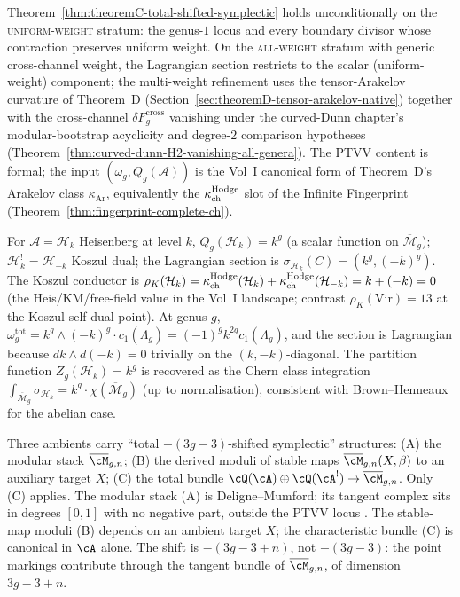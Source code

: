 \begin{remark}
\label{rem:theoremC-total-scope}
Theorem~\ref{thm:theoremC-total-shifted-symplectic} holds
unconditionally on the \textsc{uniform-weight} stratum: the
genus-$1$ locus and every boundary divisor whose contraction
preserves uniform weight. On the \textsc{all-weight} stratum
with generic cross-channel weight, the Lagrangian section
restricts to the scalar (uniform-weight) component; the
multi-weight refinement uses the tensor-Arakelov curvature of
Theorem~D (Section~\ref{sec:theoremD-tensor-arakelov-native})
together with the cross-channel
$\delta F_g^{\mathrm{cross}}$ vanishing under the curved-Dunn
chapter's modular-bootstrap acyclicity and degree-\(2\)
comparison hypotheses
(Theorem~\ref{thm:curved-dunn-H2-vanishing-all-genera}). The
PTVV content is formal; the input
$(\omega_g, Q_g(\mathcal{A}))$ is the Vol~I canonical form of
Theorem~D's Arakelov class $\kappa_{\mathrm{Ar}}$, equivalently
the $\kappa_{\mathrm{ch}}^{\mathrm{Hodge}}$ slot of the Infinite Fingerprint
(Theorem~\ref{thm:fingerprint-complete-ch}).
\end{remark}

\begin{example}
\label{ex:theoremC-heisenberg}
For $\mathcal{A} = \mathcal{H}_k$ Heisenberg at level $k$,
$Q_g(\mathcal{H}_k) = k^g$ (a scalar function on
$\overline{\mathcal{M}}_g$); $\mathcal{H}_k^! = \mathcal{H}_{-k}$
Koszul dual; the Lagrangian section is
$\sigma_{\mathcal{H}_k}(C) = (k^g, (-k)^g)$. The Koszul conductor
is $\rho_K(\mathcal{H}_k) = \kappa_{\mathrm{ch}}^{\mathrm{Hodge}}(\mathcal{H}_k) +
\kappa_{\mathrm{ch}}^{\mathrm{Hodge}}(\mathcal{H}_{-k}) = k + (-k) = 0$ (the Heis/KM/free-field
value in the Vol~I landscape; contrast $\rho_K(\mathrm{Vir}) = 13$
at the Koszul self-dual point).
At genus $g$, $\omega^{\mathrm{tot}}_g = k^g \wedge (-k)^g \cdot
c_1(\Lambda_g) = (-1)^g k^{2g} c_1(\Lambda_g)$, and the section is
Lagrangian because $dk \wedge d(-k) = 0$ trivially on the
$(k,-k)$-diagonal. The partition function
$Z_g(\mathcal{H}_k) = k^g$ is recovered as the Chern class
integration $\int_{\overline{\mathcal{M}}_g} \sigma_{\mathcal{H}_k}
= k^g \cdot \chi(\overline{\mathcal{M}}_g)$ (up to normalisation),
consistent with Brown--Henneaux for the abelian case.
\end{example}

\begin{remark}
\label{rem:theoremC-ambient-identification}
Three ambients carry ``total $-(3g{-}3)$-shifted symplectic''
structures: (A) the modular stack $\overline{\cM}_{g,n}$;
(B) the derived moduli of stable maps
$\overline{\cM}_{g,n}(X, \beta)$ to an auxiliary target $X$;
(C) the total bundle
$\cQ(\cA) \oplus \cQ(\cA^!) \to \overline{\cM}_{g,n}$. Only (C)
applies. The modular stack (A) is Deligne--Mumford; its tangent
complex sits in degrees $[0,1]$ with no negative part, outside the
PTVV locus \cite[Rem.~2.7]{PTVV13}. The stable-map moduli (B)
depends on an ambient target $X$; the characteristic bundle (C) is
canonical in $\cA$ alone. The shift is $-(3g{-}3{+}n)$, not
$-(3g{-}3)$: the point markings contribute through the tangent
bundle of $\overline{\cM}_{g,n}$, of dimension $3g-3+n$.
\end{remark}

